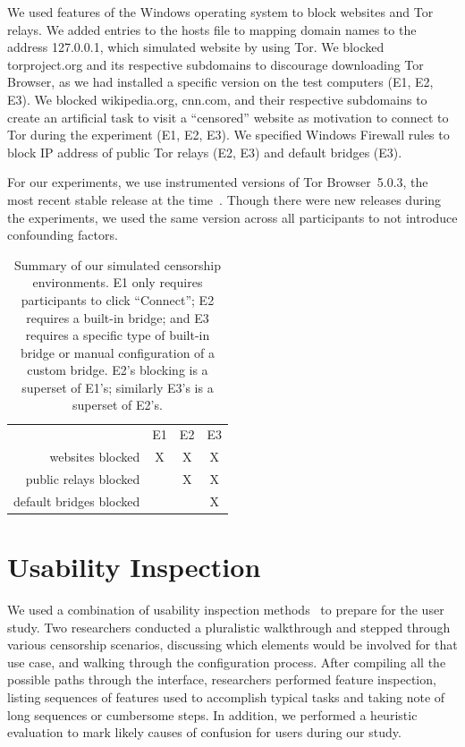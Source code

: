 \documentclass[USenglish,oneside,twocolumn]{article}
\begin{document}
We used features of the Windows operating system 
to block websites and Tor relays. 
We added entries to the hosts file to
mapping domain names to the address 127.0.0.1, which simulated
website by using Tor. We blocked torproject.org and its respective subdomains to discourage downloading Tor Browser, as we had installed a specific version on the test computers (E1, E2, E3).  We blocked wikipedia.org, cnn.com, and their respective subdomains to create an artificial task to visit a 
``censored'' website as motivation to connect to Tor during the experiment (E1, E2, E3). 
We specified Windows Firewall rules to block IP address of public Tor relays (E2, E3) and default bridges (E3).

For our experiments, we use instrumented versions of Tor Browser~5.0.3, 
the most recent stable release at the time~\cite{torbrowser-503}.
Though there were new releases during the experiments,
we used the same version across all participants to not introduce
confounding factors.

\begin{table}[t]
\centering
\begin{tabular}{r c c c}
& E1 & E2 & E3 \\
websites blocked & X & X & X \\
public relays blocked & & X & X \\
default bridges blocked & & & X \\
\end{tabular}
\caption{
Summary of our simulated censorship environments.
E1 only requires participants to click ``Connect'';
E2 requires a built-in bridge;
and E3 requires a specific type of built-in bridge
or manual configuration of a custom bridge.
E2's blocking is a superset of E1's;
similarly E3's is a superset of E2's.
}
\label{tab:environments}
\end{table}

\section{Usability Inspection}
{\color {red}
We used a combination of usability inspection methods~\cite{nielsen1994usability}
to prepare for the user study. Two researchers conducted a pluralistic 
walkthrough and stepped through various censorship
scenarios, discussing which elements would be involved for that use case, and walking 
through the configuration process. After compiling all the possible paths through the 
interface, researchers performed feature inspection, listing sequences of features used 
to accomplish typical tasks and taking note of long sequences or cumbersome
steps. In addition, we performed a heuristic evaluation to mark
likely causes of confusion for users during our study.
}
\end{document}
